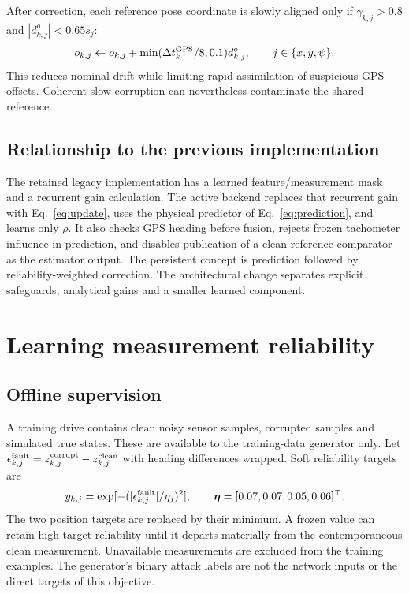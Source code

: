 ﻿\documentclass[10pt,a4paper]{article}
\begin{document}
After correction, each reference pose coordinate is slowly aligned only if
$\gamma_{k,j}>0.8$ and $|d^o_{k,j}|<0.65s_j$:
\begin{equation}
 o_{k,j}\leftarrow o_{k,j}
 +\min(\Delta t_k^{\rm GPS}/8,0.1)d^o_{k,j},\qquad j\in\{x,y,\psi\}.
 \label{eq:align}
\end{equation}
This reduces nominal drift while limiting rapid assimilation of suspicious GPS offsets.
Coherent slow corruption can nevertheless contaminate the shared reference.

\subsection{Relationship to the previous implementation}
The retained legacy implementation has a learned feature/measurement mask and a recurrent
gain calculation. The active backend replaces that recurrent gain with Eq.~\eqref{eq:update},
uses the physical predictor of Eq.~\eqref{eq:prediction}, and learns only $\rho$.
It also checks GPS heading before fusion, rejects frozen tachometer influence in prediction,
and disables publication of a clean-reference comparator as the estimator output.
The persistent concept is prediction followed by reliability-weighted correction.
The architectural change separates explicit safeguards, analytical gains and a smaller
learned component.

\section{Learning measurement reliability}
\subsection{Offline supervision}
A training drive contains clean noisy sensor samples, corrupted samples and simulated true
states. These are available to the training-data generator only.
Let $\epsilon_{k,j}^{\rm fault}=z_{k,j}^{\rm corrupt}-z_{k,j}^{\rm clean}$
with heading differences wrapped. Soft reliability targets are
\begin{equation}
 y_{k,j}=\exp[-(|\epsilon_{k,j}^{\rm fault}|/\eta_j)^2],
 \qquad \bm\eta=[0.07,0.07,0.05,0.06]^\top .
 \label{eq:target}
\end{equation}
The two position targets are replaced by their minimum.
A frozen value can retain high target reliability until it departs materially
from the contemporaneous clean measurement.
Unavailable measurements are excluded from the training examples.
The generator's binary attack labels are not the network inputs or the direct targets
of this objective.
\end{document}

